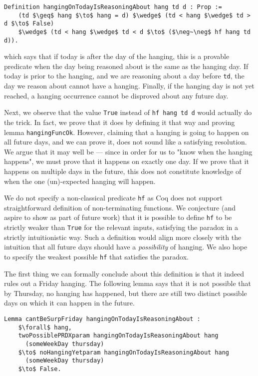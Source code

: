 \documentclass[runningheads]{llncs}
\begin{document}
\begin{lstlisting}[mathescape=true]
  Definition hangingOnTodayIsReasoningAbout hang td d : Prop :=
    (td $\geq$ hang $\to$ hang = d) $\wedge$ (td < hang $\wedge$ td > d $\to$ False)
    $\wedge$ (td < hang $\wedge$ td < d $\to$ ($\neg~\neg$ hf hang td d)).
\end{lstlisting}

which says that if today is after the day of the hanging, this is a provable predicate when the
day being reasoned about is the same as the hanging day. If today is prior to the hanging, and
we are reasoning about a day before {\tt td}, the day we reason about cannot have a hanging.
Finally, if the hanging day is not
yet reached, a hanging occurrence cannot be disproved about any future day.

Next, we observe that the value {\tt True} instead of {\tt hf hang td d} would
actually do the trick. In fact, we prove that it does by defining it that
way and proving lemma {\tt hangingFuncOk}. However, claiming that a hanging is going to happen
on all future days, and we can prove it, does not sound like a satisfying
resolution. We argue that it may well be --- since in order for us to
"know when the hanging happens", we must prove that it happens on exactly one day.
If we prove that it happens on multiple days in the future, this does not
constitute knowledge of when the one (un)-expected hanging will happen.

We do not specify a non-classical predicate {\tt hf} as Coq does not support
straightforward definition of non-terminating functions.
We conjecture (and aspire to show as part of future work) that it is possible to
define {\tt hf} to be strictly weaker than {\tt True} for the relevant inputs,
satisfying the paradox in a strictly intuitionistic way. Such a definition would align more closely with
the intuition that all future days should have a \emph{possibility} of hanging.
We also hope to specify the weakest possible {\tt hf} that satisfies the paradox.

The first thing we can formally conclude about this definition is that it indeed rules out
a Friday hanging. The following lemma says that it is not possible that by Thursday,
no hanging has happened, but there are still two distinct possible days on which it can
happen in the future.

\begin{lstlisting}[mathescape=true]
  Lemma cantBeSurpFriday hangingOnTodayIsReasoningAbout :
    $\forall$ hang,
    twoPossiblePRDXparam hangingOnTodayIsReasoningAbout hang
      (someWeekDay thursday)
    $\to$ noHangingYetparam hangingOnTodayIsReasoningAbout hang
      (someWeekDay thursday)
    $\to$ False.
\end{lstlisting}
\end{document}
